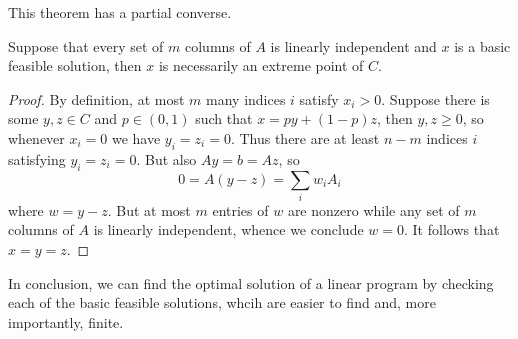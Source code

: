 This theorem has a partial converse.
\begin{theorem}
    Suppose that every set of $m$ columns of $A$ is linearly independent and $x$ is a basic feasible solution, then $x$ is necessarily an extreme point of $C$.
\end{theorem}
\begin{proof}
    By definition, at most $m$ many indices $i$ satisfy $x_i>0$.
    Suppose there is some $y,z\in C$ and $p\in (0,1)$ such that $x=py+(1-p)z$, then $y,z\ge 0$, so whenever $x_i=0$ we have $y_i=z_i=0$.
    Thus there are at least $n-m$ indices $i$ satisfying $y_i=z_i=0$.
    But also $Ay=b=Az$, so
    $$0=A(y-z)=\sum_{i}w_iA_i$$
    where $w=y-z$.
    But at most $m$ entries of $w$ are nonzero while any set of $m$ columns of $A$ is linearly independent, whence we conclude $w=0$.
    It follows that $x=y=z$.
\end{proof}
In conclusion, we can find the optimal solution of a linear program by checking each of the basic feasible solutions, whcih are easier to find and, more importantly, finite.
